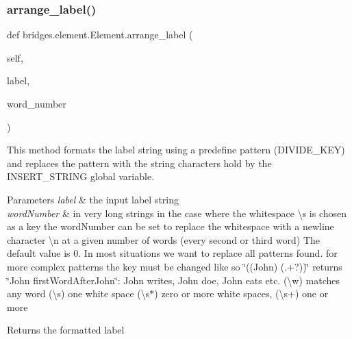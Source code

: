 \mbox{\label{classbridges_1_1element_1_1_element_ad1bf2f767776d8dbc8afc92a35396254}} 
\subsubsection{\texorpdfstring{arrange\+\_\+label()}{arrange\_label()}}
{\footnotesize\ttfamily def bridges.\+element.\+Element.\+arrange\+\_\+label (\begin{DoxyParamCaption}\item[{}]{self,  }\item[{}]{label,  }\item[{}]{word\+\_\+number }\end{DoxyParamCaption})}



This method formats the label string using a predefine pattern (D\+I\+V\+I\+D\+E\+\_\+\+K\+EY) and replaces the pattern with the string characters hold by the I\+N\+S\+E\+R\+T\+\_\+\+S\+T\+R\+I\+NG global variable. 


\begin{DoxyParams}{Parameters}
{\em label} & the input label string\\
\hline
{\em word\+Number} & in very long strings in the case where the whitespace \textbackslash{}s is chosen as a key the word\+Number can be set to replace the whitespace with a newline character \textbackslash{}n at a given number of words (every second or third word) The default value is 0. In most situations we want to replace all patterns found. for more complex patterns the key must be changed like so \char`\"{}((\+John) (.+?))\char`\"{} returns \char`\"{}\+John first\+Word\+After\+John\char`\"{}\+: John writes, John doe, John eats etc. (\textbackslash{}w) matches any word (\textbackslash{}s) one white space (\textbackslash{}s$\ast$) zero or more white spaces, (\textbackslash{}s+) one or more\\
\hline
\end{DoxyParams}
\begin{DoxyReturn}{Returns}
the formatted label 
\end{DoxyReturn}
\mbox{\label{classbridges_1_1element_1_1_element_ae5f31192ad8bf482ab591dbe688ff0ab}} 
